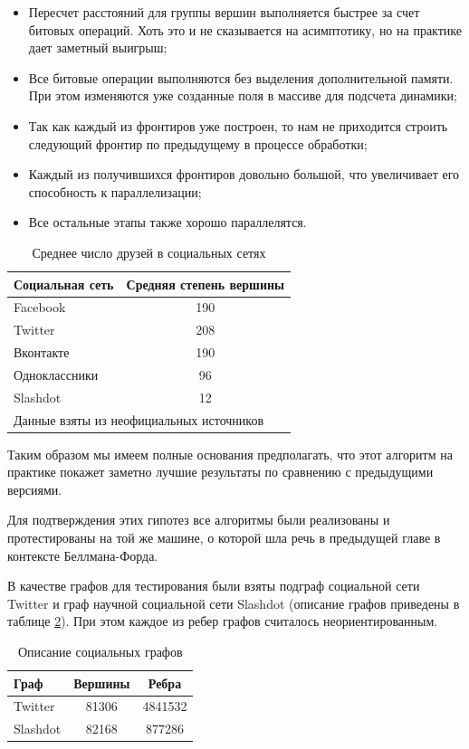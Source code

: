 \begin{itemize}
  \item Пересчет расстояний для группы вершин выполняется быстрее за счет битовых операций. Хоть это и не сказывается на асимптотику, но на практике дает заметный выигрыш; 
  \item Все битовые операции выполняются без выделения дополнительной памяти. При этом изменяются уже созданные поля в массиве для подсчета динамики;
  \item Так как каждый из фронтиров уже построен, то нам не приходится строить следующий фронтир по предыдущему в процессе обработки;
  \item Каждый из получившихся фронтиров довольно большой, что увеличивает его способность к параллелизации;
  \item Все остальные этапы также хорошо параллелятся.
\end{itemize}

\begin{table}[H]
\centering
\caption{Среднее число друзей в социальных сетях}

\begin{tabular}{l|c}  
\hline
Социальная сеть & Средняя степень вершины\\
\hline\hline
Facebook & 190 \\  
Twitter & 208  \\
Вконтакте & 190  \\
Одноклассники & 96  \\
Slashdot & 12  \\
\hline
\multicolumn{2}{l}{\footnotesize Данные взяты из неофициальных источников}\\
\end{tabular}
\label {table:algo_floyd_avg_vertex_degree}
\end{table}

Таким образом мы имеем полные основания предполагать, что этот алгоритм на практике покажет заметно лучшие результаты по сравнению с предыдущими версиями. 

Для подтверждения этих гипотез все алгоритмы были реализованы и протестированы на той же машине, о которой шла речь в предыдущей главе в контексте Беллмана-Форда.

В качестве графов для тестирования были взяты подграф социальной сети Twitter и граф научной социальной сети Slashdot (описание графов приведены в таблице \ref{table:algo_floyd_graph_description}). При этом каждое из ребер графов считалось неориентированным. \FloatBarrier
\begin{table}[H]
\centering
\caption{Описание социальных графов}

\begin{tabular}{l|c|c} 
\hline 
Граф & Вершины & Ребра\\
\hline\hline
Twitter & 81306 & 4841532\\  
Slashdot & 82168 & 877286  \\
\hline
\end{tabular}

\label {table:algo_floyd_graph_description}
\end{table}


